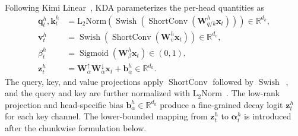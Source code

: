Following Kimi Linear~\citep{team2025kimi}, KDA parameterizes the per-head quantities as
\begin{align}
    \bm{q}_t^h,\bm{k}_t^h
     & = \operatorname{L_2Norm}\!\left(\operatorname{Swish}\!\left(\operatorname{ShortConv}\!\left(\mathbf{W}_{q/k}^h\bm{x}_t\right)\right)\right)
    \in \mathbb{R}^{d_k}, \nonumber                                                                                                                \\
    \bm{v}_t^h
     & = \operatorname{Swish}\!\left(\operatorname{ShortConv}\!\left(\mathbf{W}_v^h\bm{x}_t\right)\right)
    \in \mathbb{R}^{d_v}, \nonumber                                                                                                                \\
    \beta_t^h
     & = \operatorname{Sigmoid}\!\left(\mathbf{W}_{\beta}^h\bm{x}_t\right)
    \in (0,1), \nonumber                                                                                                                           \\
    \bm{z}_t^h
     & = \mathbf{W}_{\alpha}^{\uparrow}\mathbf{W}_{\alpha}^{\downarrow}\bm{x}_t + \bm{b}_{\alpha}^h
    \in \mathbb{R}^{d_k}.
    \label{eq:kda-param}
\end{align}
The query, key, and value projections apply $\operatorname{ShortConv}$ followed by $\operatorname{Swish}$~\citep{yang-2025-gdn}, and the query and key are further normalized with $\operatorname{L_2Norm}$~\citep{yang-2024-parallelizing}.
The low-rank projection and head-specific bias $\bm{b}_{\alpha}^h\in\mathbb{R}^{d_k}$ produce a fine-grained decay logit $\bm{z}_t^h$ for each key channel.
The lower-bounded mapping from $\bm{z}_t^h$ to $\bm{\alpha}_t^h$ is introduced after the chunkwise formulation below.

